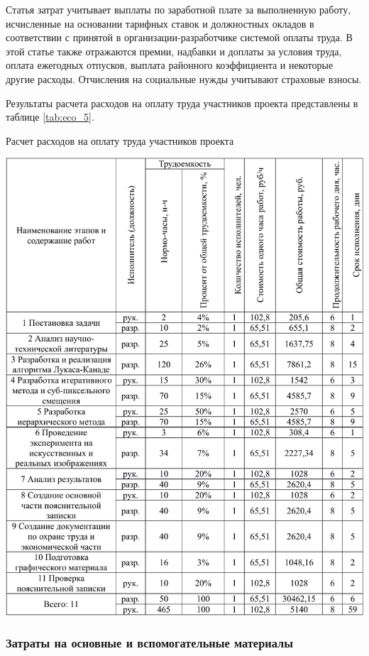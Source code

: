 Статья затрат учитывает выплаты по заработной плате за выполненную работу, исчисленные на основании тарифных ставок и должностных окладов в соответствии с принятой в организации-разработчике системой оплаты труда. В этой статье также отражаются премии, надбавки и доплаты за условия труда, оплата ежегодных отпусков, выплата районного коэффициента и некоторые другие расходы. Отчисления на социальные нужды учитывают страховые взносы.

Результаты расчета расходов на оплату труда участников проекта представлены в таблице \ref{tab:eco_5}.

\begin{table}[!ht]
\caption{Расчет расходов на оплату труда участников проекта}
\centering
\includegraphics[page=5, width=1\linewidth]{econom_table.pdf}
\label{tab:eco_5}
\end{table}

\subsubsection{Затраты на основные и вспомогательные материалы}

